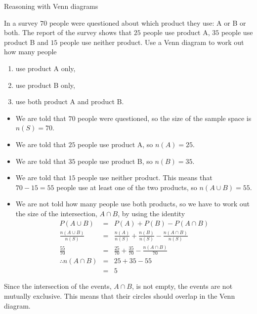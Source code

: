 \begin{wex}{Reasoning with Venn diagrams}{
  In a survey $70$ people were questioned about which product they
  use: A or B or both. The report of the survey shows that $25$
  people use product A, $35$ people use product B and $15$ people use
  neither product. Use a Venn diagram to work out how many people
  \begin{enumerate}[itemsep=5pt, label=\textbf{\arabic*}. ]
  \item use product A only,
  \item use product B only,
  \item use both product A and product B.
  \end{enumerate}
}{
  \begin{itemize}
  \item We are told that $70$ people were questioned, so the size of the
    sample space is $n(S) = 70$.
  \item We are told that $25$ people use product A, so $n(A) = 25$.
  \item We are told that $35$ people use product B, so $n(B) = 35$.
  \item We are told that $15$ people use neither product. This means
    that $70-15=55$ people use at least one of the two products, so
    $n(A \cup B) = 55$.
  \item We are not told how many people use both products, so we have
    to work out the size of the intersection, $A \cap B$, by using the
    identity
    \begin{eqnarray*}
      P(A \cup B) & = & P(A) + P(B) - P(A \cap B) \\
      \frac{n(A \cup B)}{n(S)} & = & \frac{n(A)}{n(S)} + \frac{n(B)}{n(S)} - \frac{n(A \cap B)}{n(S)} \\
      \frac{55}{70} & = & \frac{25}{70} + \frac{35}{70} - \frac{n(A \cap B)}{70} \\
      \therefore n(A \cap B) & = & 25 + 35 - 55 \\
      & = & 5
    \end{eqnarray*}
  \end{itemize}

  Since the intersection of the events, $A \cap B$, is not empty, the
  events are not mutually exclusive. This means that their circles
  should overlap in the Venn diagram.

}
\end{wex}
